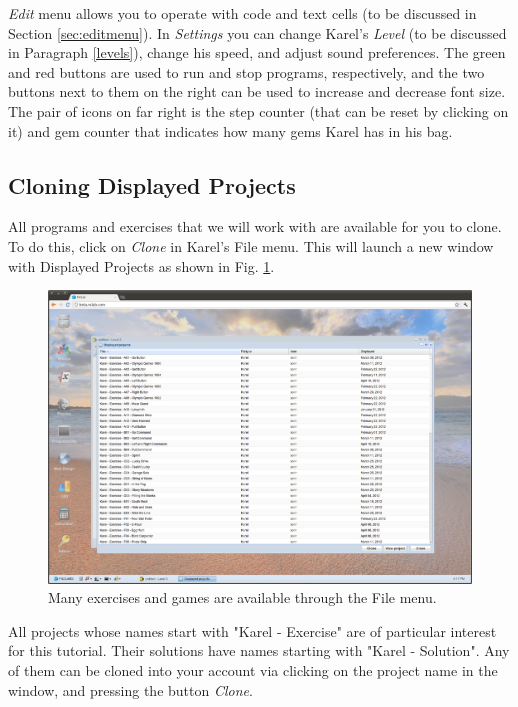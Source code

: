 {\em Edit} menu allows you to operate with code and text cells (to be discussed in 
Section \ref{sec:editmenu}). In {\em Settings} you can change Karel's {\em Level} (to be discussed
in Paragraph \ref{levels}), change his speed, and adjust sound preferences. The green and red 
buttons are used to run and stop programs, respectively, and the two buttons next to them on
the right can be used to increase and decrease font size. The pair of icons on far right is the 
step counter (that can be reset by clicking on it) and gem counter that indicates how many gems 
Karel has in his bag.

\subsection{Cloning Displayed Projects} \label{cloning}

All programs and exercises that we will work with are available for you to clone. 
To do this, click on {\em Clone} in Karel's File menu. This will launch a new window 
with Displayed Projects as shown in Fig. \ref{fig:cloning}.

\begin{figure}[!ht]
\begin{center}
\includegraphics[width=\textwidth]{imgk/cloning.png}
\end{center}
\caption{Many exercises and games are available through the File menu.}
\label{fig:cloning}
\end{figure}
\newpage
\noindent
All projects whose names start with "Karel - Exercise" are of particular interest 
for this tutorial. Their solutions have names starting with "Karel - Solution". 
Any of them can be cloned into your account via clicking on the project name in the window, 
and pressing the button {\em Clone}.

